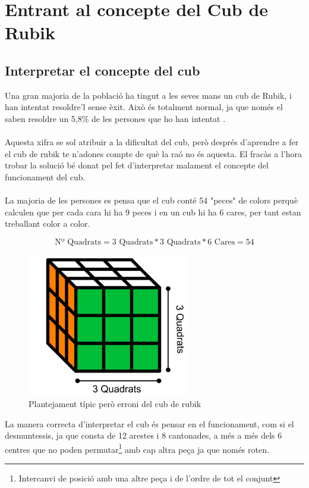 \chapter{Entrant al concepte del Cub de Rubik}

\section{Interpretar el concepte del cub}

Una gran majoria de la població ha tingut a les seves mans un cub de Rubik, i han intentat resoldre'l sense èxit. Això és totalment normal, ja que només el saben resoldre un 5,8\% de les persones que ho han intentat \cite{Redbull-cub}.
\\\\Aquesta xifra se sol atribuir a la dificultat del cub, però després d'aprendre a fer el cub de rubik te n'adones compte de què la raó no és aquesta. El fracàs a l'hora trobar la solució bé donat pel fet d'interpretar malament el concepte del funcionament del cub.
\\\\La majoria de les persones es pensa que el cub conté 54 "peces" de colors perquè calculen que per cada cara hi ha 9 peces i en un cub hi ha 6 cares, per tant estan treballant color a color.

$$ \textrm{Nº Quadrats} = 3\textrm{ Quadrats}*3\textrm{ Quadrats}*6\textrm{ Cares} = 54 $$

\begin{figure}[ht]
    \centering
    \includegraphics[width=7cm]{img/figures/plantejament-no.png}
    \caption{Plantejament típic però erroni del cub de rubik}
    \label{fig:plantejament-no}
\end{figure}

La manera correcta d'interpretar el cub és pensar en el funcionament, com si el desmuntessis, ja que consta de 12 arestes i 8 cantonades, a més a més dels 6 centres que no poden permutar\footnote{Intercanvi de posició amb una altre peça i de l'ordre de tot el conjunt} amb cap altra peça ja que només roten.

